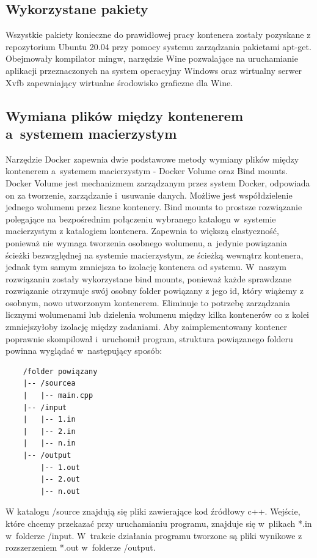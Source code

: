 \subsection{Wykorzystane pakiety}
Wszystkie pakiety konieczne do prawidłowej pracy kontenera zostały pozyskane z repozytorium Ubuntu 20.04 przy pomocy systemu zarządzania pakietami apt-get. Obejmowały kompilator mingw, narzędzie Wine pozwalające na uruchamianie aplikacji przeznaczonych na system operacyjny Windows oraz wirtualny serwer Xvfb zapewniający wirtualne środowisko graficzne dla Wine.

\subsection{Wymiana plików między kontenerem a~systemem macierzystym}
Narzędzie Docker zapewnia dwie podstawowe metody wymiany plików między kontenerem a~systemem macierzystym - Docker Volume\cite{dockerVolume} oraz Bind mounts\cite{dockerBindMounts}. Docker Volume jest mechanizmem zarządzanym przez system Docker, odpowiada on za tworzenie, zarządzanie i~usuwanie danych. Możliwe jest współdzielenie jednego wolumenu przez liczne kontenery. Bind mounts to prostsze rozwiązanie polegające na bezpośrednim połączeniu wybranego katalogu w~systemie macierzystym z katalogiem kontenera. Zapewnia to większą elastyczność, ponieważ nie wymaga tworzenia osobnego wolumenu, a~jedynie powiązania ścieżki bezwzględnej na systemie macierzystym, ze ścieżką wewnątrz kontenera, jednak tym samym zmniejsza to izolację kontenera od systemu. W~naszym rozwiązaniu zostały wykorzystane bind mounts, ponieważ każde sprawdzane rozwiązanie otrzymuje swój osobny folder powiązany z jego id, który wiążemy z osobnym, nowo utworzonym kontenerem. Eliminuje to potrzebę zarządzania licznymi wolumenami lub dzielenia wolumenu między kilka kontenerów co z kolei zmniejszyłoby izolację między zadaniami. Aby zaimplementowany kontener poprawnie skompilował i~uruchomił program, struktura powiązanego folderu powinna wyglądać w~następujący sposób:
\begin{verbatim}
    /folder powiązany
    |-- /sourcea
    |   |-- main.cpp
    |-- /input
    |   |-- 1.in
    |   |-- 2.in
    |   |-- n.in
    |-- /output
        |-- 1.out
        |-- 2.out
        |-- n.out
\end{verbatim}
W katalogu /source znajdują się pliki zawierające kod źródłowy c++. Wejście, które chcemy przekazać przy uruchamianiu programu, znajduje się w~plikach *.in w~folderze /input. W~trakcie działania programu tworzone są pliki wynikowe z rozszerzeniem *.out w~folderze /output. 

